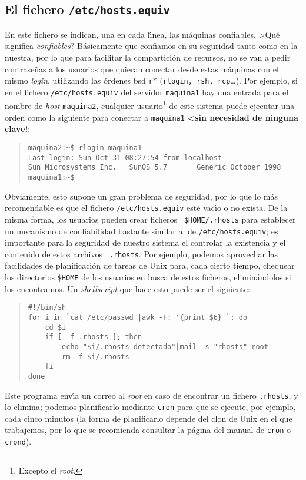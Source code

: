 \subsection{El fichero {\tt /etc/hosts.equiv}}
En este fichero se indican, una en cada l\'{\i}nea, las m\'aquinas confiables.
>Qu\'e significa {\it confiables}? B\'asicamente que confiamos en su seguridad
tanto como en la nuestra, por lo que para facilitar la compartici\'on de 
recursos, no se van a pedir contrase\~nas a los usuarios que quieran conectar
desde estas m\'aquinas con el mismo {\it login}, utilizando las \'ordenes 
{\sc bsd} {\tt r$\ast$} ({\tt rlogin, rsh, rcp}\ldots). Por ejemplo, si en el
fichero {\tt /etc/hosts.equiv} del servidor {\tt maquina1} hay una entrada 
para el nombre
de {\it host} {\tt maquina2}, cualquier usuario\footnote{Excepto el {\it 
root}.} de este sistema puede ejecutar una orden como la siguiente para 
conectar a {\tt maquina1} {\bf <sin necesidad de ninguna clave!}:
\begin{quote}
\begin{verbatim}
maquina2:~$ rlogin maquina1
Last login: Sun Oct 31 08:27:54 from localhost
Sun Microsystems Inc.   SunOS 5.7       Generic October 1998
maquina1:~$ 
\end{verbatim}
\end{quote}
Obviamente, esto supone un gran problema de seguridad, por lo que lo m\'as 
recomendable es que el fichero {\tt /etc/hosts.equiv} est\'e vac\'{\i}o o no 
exista. De la misma forma, los usuarios pueden crear ficheros {\tt 
\$HOME/.rhosts} para establecer un mecanismo de confiabilidad bastante similar
al de {\tt /etc/hosts.equiv}; es importante para la seguridad de nuestro 
sistema el controlar la existencia y el contenido de estos archivos {\tt 
.rhosts}. Por ejemplo, podemos aprovechar las facilidades de planificaci\'on de
tareas de Unix para, cada cierto tiempo, chequear los directorios {\tt \$HOME}
de los usuarios en busca de estos ficheros, elimin\'andolos si los 
encontramos. Un {\it shellscript} que hace esto puede ser el siguiente:
\label{scriptrhosts}
\begin{quote}
\begin{verbatim}
#!/bin/sh
for i in `cat /etc/passwd |awk -F: '{print $6}'`; do
    cd $i
    if [ -f .rhosts ]; then
        echo "$i/.rhosts detectado"|mail -s "rhosts" root
        rm -f $i/.rhosts
    fi
done
\end{verbatim}
\end{quote}
Este programa env\'{\i}a un correo al {\it root} en caso de encontrar un 
fichero {\tt .rhosts}, y lo elimina; podemos planificarlo mediante {\tt cron}
para que se ejecute, por ejemplo, cada cinco minutos (la forma de planificarlo
depende del clon de Unix en el que trabajemos, por lo que se recomienda 
consultar la p\'agina del manual de {\tt cron} o {\tt crond}).
